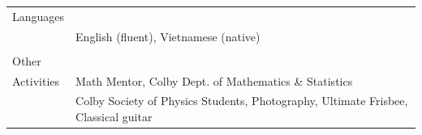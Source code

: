 \documentclass[10pt]{article}
\begin{document}
\begin{longtable}{ l p{14.7cm}   }
  				

  \large{Languages}     & \\
  						& English (fluent), Vietnamese (native) \\
						& \\
  						 
  \large{Other}         & \\ 
  \large{Activities}	& Math Mentor, Colby Dept. of Mathematics \& Statistics \\
  						& Colby Society of Physics Students, Photography, Ultimate Frisbee, Classical guitar \\
  						
  						
  						


     		

%  						
%  						
%  						
%  						
%  						
%  						
  						
  
  
\end{longtable}
\end{document}

